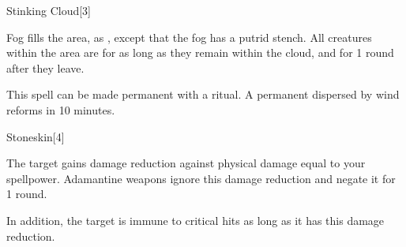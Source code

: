 \begin{spellsection}{Stinking Cloud}[3]
    \begin{spellheader}
    \end{spellheader}
    \begin{spellcontent}
        \begin{spelltargetinginfo}
        \end{spelltargetinginfo}
        \begin{spelleffects}
            \spelleffect Fog fills the area, as , except that the fog has a putrid stench. All creatures within the area are \sickened for as long as they remain within the cloud, and for 1 round after they leave.
            \spelldur \durshort
        \end{spelleffects}
    \end{spellcontent}
    \begin{spellfooter}
        \spellnotes This spell can be made permanent with a  ritual. A permanent  dispersed by wind reforms in 10 minutes. \fogspellnotes \fogwindspellnotes

        \physicalspellnotes
        \miscastyou
    \end{spellfooter}
\end{spellsection}

\begin{spellsection}{Stoneskin}[4]
    \begin{spellheader}
    \end{spellheader}
    \begin{spellcontent}
        \begin{spelltargetinginfo}
        \end{spelltargetinginfo}
        \begin{spelleffects}
            \spelleffect The target gains damage reduction against physical damage equal to your spellpower. Adamantine weapons ignore this damage reduction and negate it for 1 round.

            In addition, the target is immune to critical hits as long as it has this damage reduction.
            \spelldur \durpersonallong
        \end{spelleffects}
    \end{spellcontent}
    \begin{spellfooter}
        \miscastexplode
    \end{spellfooter}
\end{spellsection}

